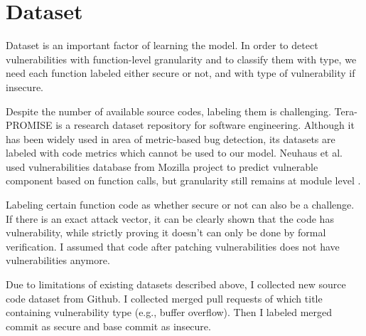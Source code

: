 \section{Dataset}
\label{section:dataset}

Dataset is an important factor of learning the model.
In order to detect vulnerabilities with function-level granularity and to classify them with type, we need each function labeled either secure or not, and with type of vulnerability if insecure.

Despite the number of available source codes, labeling them is challenging.
Tera-PROMISE \cite{promiserepo} is a research dataset repository for software engineering. Although it has been widely used in area of metric-based bug detection, its datasets are labeled with code metrics which cannot be used to our model.
Neuhaus et al. used vulnerabilities database from Mozilla project to predict vulnerable component based on function calls, but granularity still remains at module level \cite{neuhaus2007predicting}.

Labeling certain function code as whether secure or not can also be a challenge.
If there is an exact attack vector, it can be clearly shown that the code has vulnerability, while strictly proving it doesn't can only be done by formal verification.
I assumed that code after patching vulnerabilities does not have vulnerabilities anymore.

Due to limitations of existing datasets described above, I collected new source code dataset from Github.
I collected merged pull requests of which title containing vulnerability type (e.g., buffer overflow).
Then I labeled merged commit as secure and base commit as insecure.